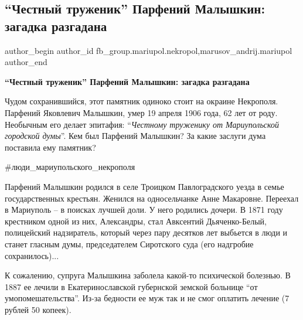  
 
 
 
 

\subsection{\enquote{Честный труженик} Парфений Малышкин: загадка разгадана}
\label{sec:24_01_2022.fb.fb_group.mariupol.nekropol.1._chestnii_truzhenik_}
 
\ifcmt
 author_begin
   author_id fb_group.mariupol.nekropol,marusov_andrij.mariupol
 author_end
\fi

\textbf{\enquote{Честный труженик} Парфений Малышкин: загадка разгадана}

Чудом сохранившийся, этот памятник одиноко стоит на окраине Некрополя. Парфений
Яковлевич Малышкин, умер 19 апреля 1906 года, 62 лет от роду. Необычным его
делает эпитафия: \enquote{\em Честному труженику от Мариупольской городской думы}. Кем был
Парфений Малышкин? За какие заслуги дума поставила ему памятник?


\#люди\_мариупольского\_некрополя

Парфений Малышкин родился в селе Троицком Павлоградского уезда в семье
государственных крестьян. Женился на односельчанке Анне Макаровне. Переехал в
Мариуполь – в поисках лучшей доли. У него родились дочери. В 1871 году
крестником одной из них, Александры, стал Авксентий Дьяченко-Белый, полицейский
надзиратель, который через пару десятков лет выбьется в люди и станет гласным
думы, председателем Сиротского суда (его надгробие сохранилось)...

К сожалению, супруга Малышкина заболела какой-то психической болезнью. В 1887
ее лечили в Екатеринославской губернской земской больнице \enquote{от
умопомешательства}. Из-за бедности ее муж так и не смог оплатить лечение (7
рублей 50 копеек).

